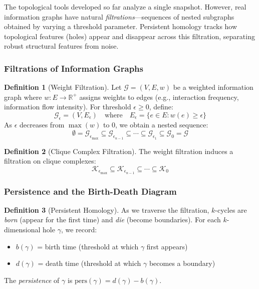 \documentclass[12pt,a4paper]{article}
\theoremstyle{definition}
\newtheorem{definition}{Definition}[section]
\theoremstyle{remark}
\newcommand{\Real}{\mathbb{R}}           %
\newcommand{\Graph}{\mathcal{G}}         %
\begin{document}
The topological tools developed so far analyze a single snapshot. However, real information graphs have natural \emph{filtrations}—sequences of nested subgraphs obtained by varying a threshold parameter. Persistent homology tracks how topological features (holes) appear and disappear across this filtration, separating robust structural features from noise.

\subsubsection{Filtrations of Information Graphs}

\begin{definition}[Weight Filtration]
Let $\Graph = (V, E, w)$ be a weighted information graph where $w: E \to \Real^+$ assigns weights to edges (e.g., interaction frequency, information flow intensity). For threshold $\epsilon \geq 0$, define:
\begin{equation}
    \Graph_\epsilon = (V, E_\epsilon) \quad \text{where} \quad E_\epsilon = \{ e \in E : w(e) \geq \epsilon \}
\end{equation}
As $\epsilon$ decreases from $\max(w)$ to $0$, we obtain a nested sequence:
\begin{equation}
    \emptyset = \Graph_{\epsilon_{\max}} \subseteq \Graph_{\epsilon_{n-1}} \subseteq \cdots \subseteq \Graph_{\epsilon_1} \subseteq \Graph_0 = \Graph
\end{equation}
\end{definition}

\begin{definition}[Clique Complex Filtration]
The weight filtration induces a filtration on clique complexes:
\begin{equation}
    \mathcal{K}_{\epsilon_{\max}} \subseteq \mathcal{K}_{\epsilon_{n-1}} \subseteq \cdots \subseteq \mathcal{K}_0
\end{equation}
\end{definition}

\subsubsection{Persistence and the Birth-Death Diagram}

\begin{definition}[Persistent Homology]
As we traverse the filtration, $k$-cycles are \emph{born} (appear for the first time) and \emph{die} (become boundaries). For each $k$-dimensional hole $\gamma$, we record:
\begin{itemize}
    \item $b(\gamma)$ = birth time (threshold at which $\gamma$ first appears)
    \item $d(\gamma)$ = death time (threshold at which $\gamma$ becomes a boundary)
\end{itemize}
The \emph{persistence} of $\gamma$ is $\text{pers}(\gamma) = d(\gamma) - b(\gamma)$.
\end{definition}
\end{document}
